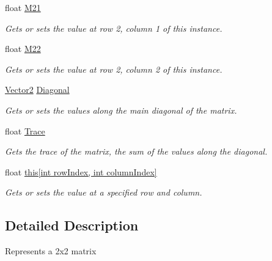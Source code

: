 \begin{DoxyCompactItemize}
float \hyperlink{struct_open_t_k_1_1_matrix2_af0d21a4607e71a4c82c01db39cbafc2c}{M21}
\begin{DoxyCompactList}\small\item\em Gets or sets the value at row 2, column 1 of this instance. \end{DoxyCompactList}\item 
float \hyperlink{struct_open_t_k_1_1_matrix2_a6b9b6b7e323353efcd52f972e9e11011}{M22}
\begin{DoxyCompactList}\small\item\em Gets or sets the value at row 2, column 2 of this instance. \end{DoxyCompactList}\item 
\hyperlink{struct_open_t_k_1_1_vector2}{Vector2} \hyperlink{struct_open_t_k_1_1_matrix2_af95195a62dda800e6466721bc6769bb1}{Diagonal}
\begin{DoxyCompactList}\small\item\em Gets or sets the values along the main diagonal of the matrix. \end{DoxyCompactList}\item 
float \hyperlink{struct_open_t_k_1_1_matrix2_ac3f3859dc69583c8924ac70e1782b0e0}{Trace}
\begin{DoxyCompactList}\small\item\em Gets the trace of the matrix, the sum of the values along the diagonal. \end{DoxyCompactList}\item 
float \hyperlink{struct_open_t_k_1_1_matrix2_ace510988a666db0540be994392b94ae6}{this\mbox{[}int row\-Index, int column\-Index\mbox{]}}
\begin{DoxyCompactList}\small\item\em Gets or sets the value at a specified row and column. \end{DoxyCompactList}\end{DoxyCompactItemize}


\subsection{Detailed Description}
Represents a 2x2 matrix 



